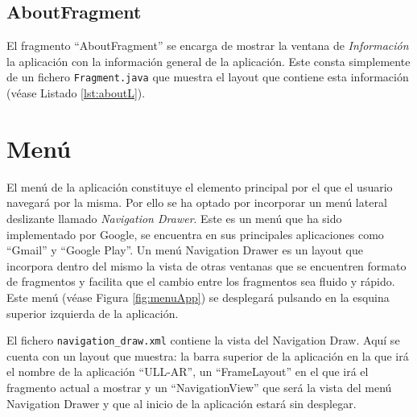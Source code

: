


  


\subsection{AboutFragment}

El fragmento ``AboutFragment'' se encarga de mostrar la ventana de \textit{Información} la aplicación con la información general de la aplicación. Este consta simplemente de un fichero \texttt{Fragment.java} que muestra el layout que contiene esta información (véase Listado \ref{lst:aboutL}).



\section{Menú}

El menú de la aplicación constituye el elemento principal por el que el usuario navegará por la misma. Por ello se ha optado por incorporar un menú lateral deslizante llamado \textit{Navigation Drawer}. Este es un menú que ha sido implementado por Google, se encuentra en sus principales aplicaciones como ``Gmail'' y ``Google Play''. Un menú Navigation Drawer es un layout que incorpora dentro del mismo la vista de otras ventanas que se encuentren formato de fragmentos y facilita que el cambio entre los fragmentos sea fluido y rápido. Este menú (véase Figura \ref{fig:menuApp}) se desplegará pulsando en la esquina superior izquierda de la aplicación.
   
El fichero \texttt{navigation\_draw.xml} contiene la vista del Navigation Draw. Aquí se cuenta con un layout que muestra: la barra superior de la aplicación en la que irá el nombre de la aplicación ``ULL-AR'', un ``FrameLayout'' en el que irá el fragmento actual a mostrar y un ``NavigationView'' que será la vista del menú Navigation Drawer y que al inicio de la aplicación estará sin desplegar.

